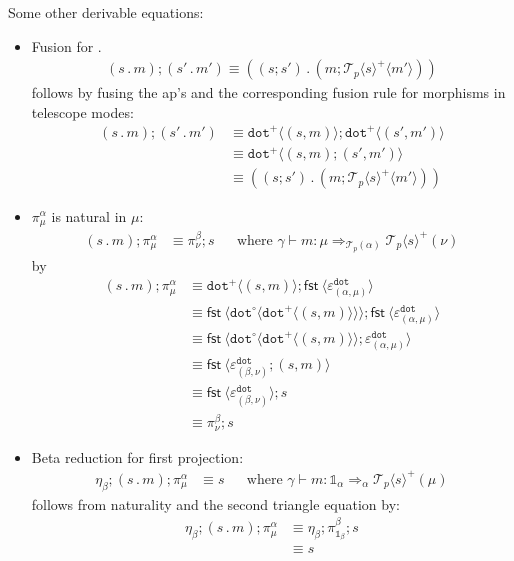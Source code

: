 \documentclass[10pt]{article}
\theoremstyle{definition}
\newcommand\dsd[1]{\ensuremath{\mathsf{#1}}}
\newcommand{\tcell}{\Rightarrow}
\newcommand{\app}[2]{\ensuremath{#1 \: #2}}
\newcommand{\fst}[1]{\app{\dsd{fst}}{#1}}
\newcommand\TermTwoT[5]{\ensuremath{#1 \vdash {#2} : #3 \tcell_{#5} #4}}
\newcommand\TrPlus[2]{\ensuremath{{#1}^+(#2)}}
\newcommand\El[2]{\mathcal{T}_{#1}(#2)}
\newcommand\ApEl[2]{\mathcal{T}_{#1}\langle#2\rangle}
\newcommand\bdot[0]{\mathbin{.}}
\newcommand\ap[2]{\ensuremath{#1 \langle #2 \rangle }}
\newcommand\ApPlus[2]{\ensuremath{{#1}^+ \langle #2 \rangle }}
\newcommand\ApCirc[2]{\ensuremath{{#1}^\circ \langle #2 \rangle }}
\newcommand{\tdot}{\ensuremath{\mathtt{dot}}}
\newcommand\One{\ensuremath{\mathds{1}}}
\begin{document}
Some other derivable equations:
\begin{itemize}
\item Fusion for $.$
\begin{align}
\label{dot-fusion}
    (s \bdot m);(s' \bdot m') \equiv ((s;s') \bdot (m;\ApPlus{\ApEl{p}{s}} {m'}))
\end{align}
follows by fusing the ap's and the corresponding fusion rule for morphisms in telescope modes:
\begin{align*}
(s \bdot m);(s' \bdot m') &\equiv \ApPlus{\tdot}{(s, m)} ; \ApPlus{\tdot}{(s', m')} \\
&\equiv \ApPlus{\tdot}{(s, m);(s', m')} \\
&\equiv ((s;s') \bdot (m;\ApPlus{\ApEl{p}{s}} {m'}))
\end{align*}

\item $\pi^\alpha_\mu$ is natural in $\mu$:
  \begin{align}
  \label{pi-naturality}
  (s \bdot m); \pi^\alpha_\mu &\equiv \pi^\beta_\nu;s && \text{where } \TermTwoT{\gamma}{m}{\mu}{\TrPlus{\ApEl{p}{s}}{\nu}}{\El{p}{\alpha}}
  \end{align}
  by
  \begin{align*}
  (s \bdot m); \pi^\alpha_\mu 
  &\equiv \ApPlus{\tdot}{(s, m)} ; \ap \fst {\varepsilon^\tdot_{(\alpha, \mu)}} \\  
  &\equiv \ap{\fst}{\ApCirc{\tdot}{\ApPlus{\tdot}{(s, m)}}} ; \ap \fst {\varepsilon^\tdot_{(\alpha, \mu)}} \\
  &\equiv \ap{\fst}{\ApCirc{\tdot}{\ApPlus{\tdot}{(s, m)}} ; \varepsilon^\tdot_{(\alpha, \mu)}}  \\
  &\equiv \ap{\fst}{\varepsilon^\tdot_{(\beta, \nu)}; (s, m) } \\
  &\equiv \ap{\fst}{\varepsilon^\tdot_{(\beta, \nu)}} ; s\\
  &\equiv \pi^\beta_\nu ; s
  \end{align*}

\item Beta reduction for first projection:
  \begin{align}
\label{beta-pi}
\eta_\beta;(s \bdot m);\pi^\alpha_\mu &\equiv s && \text{where } \TermTwoT{\gamma}{m}{\One_\alpha}{\TrPlus{\ApEl{p}{s}}{\mu}}{\alpha}
  \end{align}
follows from naturality and the second triangle equation by:
\begin{align*}
\eta_\beta;(s \bdot m);\pi^\alpha_\mu
&\equiv \eta_\beta;\pi^\beta_{\One_\beta};s \\
&\equiv s
\end{align*}


\end{itemize}
\end{document}
